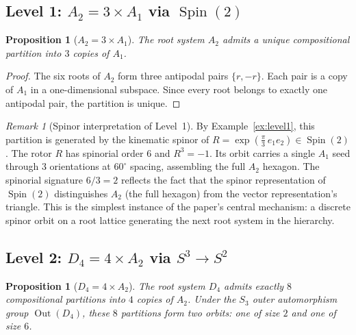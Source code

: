 \documentclass[11pt,reqno]{amsart}
\theoremstyle{plain}
\newtheorem{proposition}[theorem]{Proposition}
\theoremstyle{definition}
\theoremstyle{remark}
\newtheorem{remark}[theorem]{Remark}
\DeclareMathOperator{\Spin}{Spin}
\DeclareMathOperator{\Out}{Out}
\begin{document}
\subsection{Level 1: $A_2 = 3 \times A_1$ via $\Spin(2)$}

\begin{proposition}[$A_2 = 3 \times A_1$]\label{prop:A2}
The root system $A_2$ admits a unique compositional partition into
$3$ copies of $A_1$.
\end{proposition}

\begin{proof}
The six roots of $A_2$ form three antipodal pairs
$\{r, -r\}$.
Each pair is a copy of $A_1$ in a one-dimensional subspace.
Since every root belongs to exactly one antipodal pair,
the partition is unique.
\end{proof}

\begin{remark}[Spinor interpretation of Level~1]
\label{rem:spinorlevel1}
By Example~\ref{ex:level1}, this partition is generated by the
kinematic spinor of $R = \exp(\tfrac{\pi}{3}\, e_1 e_2)
\in \Spin(2)$.
The rotor $R$ has spinorial order $6$ and $R^3 = -1$.
Its orbit carries a single $A_1$ seed through
$3$ orientations at $60^\circ$ spacing, assembling the full
$A_2$ hexagon.
The spinorial signature $6/3 = 2$ reflects the fact that
the spinor representation of $\Spin(2)$ distinguishes $A_2$
(the full hexagon) from the vector representation's triangle.
This is the simplest instance of the paper's central mechanism:
a discrete spinor orbit on a root lattice generating the next
root system in the hierarchy.
\end{remark}

\subsection{Level 2: $D_4 = 4 \times A_2$ via $S^3 \to S^2$}

\begin{proposition}[$D_4 = 4 \times A_2$]\label{prop:D4}
The root system $D_4$ admits exactly $8$ compositional partitions
into $4$ copies of $A_2$.
Under the $S_3$ outer automorphism group $\Out(D_4)$, these $8$
partitions form two orbits: one of size $2$ and one of size $6$.
\end{proposition}
\end{document}
